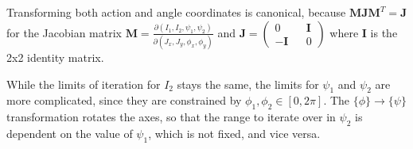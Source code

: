 Transforming both action and angle coordinates is canonical, because $\mathbf{M}\mathbf{J}\mathbf{M}^T = \mathbf{J}$ for the Jacobian matrix $\mathbf{M} = \frac{\partial(I_1,I_2,\psi_1,\psi_2)}{\partial(J_x,J_y,\phi_x,\phi_y)}$ and $\mathbf{J} = (\begin{smallmatrix} 0 && \mathbf{I} \\ -\mathbf{I} && 0 \end{smallmatrix})$ where $\mathbf{I}$ is the 2x2 identity matrix.

While the limits of iteration for $I_2$ stays the same, the limits for $\psi_1$ and $\psi_2$ are more complicated, since they are constrained by $\phi_1,\phi_2 \in [0,2\pi]$.  The $\lbrace\phi\rbrace \rightarrow \lbrace\psi\rbrace$ transformation rotates the axes, so that the range to iterate over in $\psi_2$ is dependent on the value of $\psi_1$, which is not fixed, and vice versa.  

